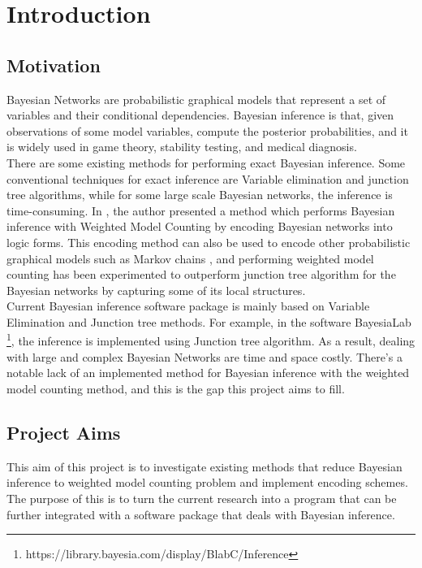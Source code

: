 
\section{Introduction}
    \subsection{Motivation}
    Bayesian Networks are probabilistic graphical models that represent a set of variables and their conditional dependencies.
   Bayesian inference is that, given observations of some model variables, compute the posterior probabilities, and it is widely used in game theory, stability testing, and medical diagnosis. \\
    
    \noindent There are some existing methods for performing exact Bayesian inference. Some conventional techniques for exact inference are Variable elimination and junction tree algorithms, while for some large scale Bayesian networks, the inference is time-consuming. In \cite{enc1}, the author presented a method which performs Bayesian inference with Weighted Model Counting by encoding Bayesian networks into logic forms. This encoding method can also be used to encode other probabilistic graphical models such as Markov chains \cite{2008-literature-review}, and performing weighted model counting has been experimented to outperform junction tree algorithm for the Bayesian networks by capturing some of its local structures.\\
    
    \noindent Current Bayesian inference software package is mainly based on Variable Elimination and Junction tree methods. For example, in the software BayesiaLab \footnote{https://library.bayesia.com/display/BlabC/Inference}, the inference is implemented using Junction tree algorithm. As a result, dealing with large and complex Bayesian Networks are time and space costly. There's a notable lack of an implemented method for Bayesian inference with the weighted model counting method, and this is the gap this project aims to fill.
    
    \subsection{Project Aims}
    This aim of this project is to investigate existing methods that reduce Bayesian inference to weighted model counting problem and implement encoding schemes. The purpose of this is to turn the current research into a program that can be further integrated with a software package that deals with Bayesian inference.\\
    
